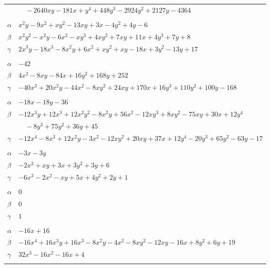 \documentclass[11pt]{article}
\begin{document}
\begin{longtable}{@{}ll@{}}
 & $\quad -2640xy-181x+y^{4}+448y^{3}-2924y^{2}+2127y-4364$\\
\addlinespace[3pt]
\multicolumn{2}{@{}l}{$\{i,j\}=\{11,42\}$, $k_{ij}=2\cdot 7$}\\
$\alpha$ & $x^{2}y-9x^{2}+xy^{2}-13xy+3x-4y^{2}+4y-6$\\
$\beta$ & $x^{2}y^{2}-x^{2}y-6x^{2}-xy^{3}+4xy^{2}+7xy+11x+4y^{3}+7y+8$\\
$\gamma$ & $2x^{3}y-18x^{3}-8x^{2}y+6x^{2}+xy^{2}+xy-18x+3y^{2}-13y+17$\\
\addlinespace[3pt]
\multicolumn{2}{@{}l}{$\{i,j\}=\{11,54\}$, $k_{ij}=2\cdot 3\cdot 7^{2}$}\\
$\alpha$ & $-42$\\
$\beta$ & $4x^{2}-8xy-84x+16y^{2}+168y+252$\\
$\gamma$ & $-40x^{3}+20x^{2}y-44x^{2}-8xy^{2}+24xy+170x+16y^{3}+110y^{2}+100y-168$\\
\addlinespace[3pt]
\multicolumn{2}{@{}l}{$\{i,j\}=\{11,83\}$, $k_{ij}=2\cdot 7^{2}$}\\
$\alpha$ & $-18x-18y-36$\\
$\beta$ & $-12x^{3}y+12x^{3}+12x^{2}y^{2}-8x^{2}y+56x^{2}-12xy^{3}+8xy^{2}-75xy+30x+12y^{4}$\\
 & $\quad -8y^{3}+75y^{2}+36y+45$\\
$\gamma$ & $-12x^{4}-8x^{3}+12x^{2}y-3x^{2}-12xy^{2}+20xy+37x+12y^{4}-20y^{3}+65y^{2}-63y-17$\\
\addlinespace[3pt]
\multicolumn{2}{@{}l}{$\{i,j\}=\{11,85\}$, $k_{ij}=2\cdot 3$}\\
$\alpha$ & $-3x-3y$\\
$\beta$ & $-2x^{2}+xy+3x+3y^{2}+3y+6$\\
$\gamma$ & $-6x^{3}-2x^{2}-xy+5x+4y^{2}+2y+1$\\
\addlinespace[3pt]
\multicolumn{2}{@{}l}{$\{i,j\}=\{11,90\}$, $k_{ij}=2$}\\
$\alpha$ & $0$\\
$\beta$ & $0$\\
$\gamma$ & $1$\\
\addlinespace[3pt]
\multicolumn{2}{@{}l}{$\{i,j\}=\{12,14\}$, $k_{ij}=3$}\\
$\alpha$ & $-16x+16$\\
$\beta$ & $-16x^{4}+16x^{3}y+16x^{3}-8x^{2}y-4x^{2}-8xy^{2}-12xy-16x+8y^{2}+6y+19$\\
$\gamma$ & $32x^{3}-16x^{2}-16x+4$\\
\addlinespace[3pt]
\multicolumn{2}{@{}l}{$\{i,j\}=\{13,30\}$, $k_{ij}=5\cdot 7^{2}$}\\

\end{longtable}
\end{document}
